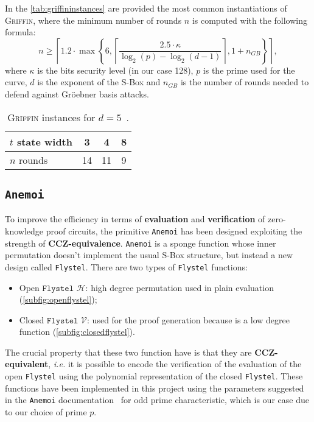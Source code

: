\documentclass[12pt, a4paper]{report}
\begin{document}
In the \autoref{tab:griffininstances} are provided the most common instantiations of \textsc{Griffin}, where the minimum number of rounds $n$ is computed with the following formula:
\begin{equation}
  n \ge \left\lceil 1.2 \cdot \max \left\{6, \left\lceil \frac{2.5 \cdot \kappa}{\log_2(p) - \log_2(d-1)} \right\rceil, 1 + n_{GB} \right\} \right\rceil ,
  \label{eq:griffinrounds}
\end{equation}
where $\kappa$ is the bits security level (in our case 128), $p$ is the prime used for the curve, $d$ is the exponent of the S-Box and $n_{GB}$ is the number of rounds needed to defend against Gr\"oebner basis attacks.

\begin{table}[H]
  \caption{\textsc{Griffin} instances for $d = 5$~\cite[Tab.~2]{griffin}.}\label{tab:griffininstances}
  \begin{center}
    \begin{tabular}{|l|c|c|c|}
      \hline
      $t$ state width & 3 & 4 & 8 \\
      \hline
      $n$ rounds & 14 & 11 & 9 \\
      \hline
    \end{tabular}
  \end{center}
\end{table}

\subsection{\texttt{Anemoi}}\label{subsec:anemoi}

To improve the efficiency in terms of \textbf{evaluation} and \textbf{verification} of zero-knowledge proof circuits, the primitive \texttt{Anemoi} has been designed exploiting the strength of \textbf{CCZ-equivalence}.
\texttt{Anemoi} is a sponge function whose inner permutation doesn't implement the usual S-Box structure, but instead a new design called \texttt{Flystel}.
There are two types of \texttt{Flystel} functions:
\begin{itemize}
  \item Open $\texttt{Flystel}$ $\mathcal{H}$: high degree permutation used in plain evaluation (\autoref{subfig:openflystel});
  \item Closed $\texttt{Flystel}$ $\mathcal{V}$: used for the proof generation because is a low degree function (\autoref{subfig:closedflystel}).
\end{itemize}
The crucial property that these two function have is that they are \textbf{CCZ-equivalent}, \textsl{i.e.} it is possible to encode the verification of the evaluation of the open \texttt{Flystel} using the polynomial representation of the closed \texttt{Flystel}.
These functions have been implemented in this project using the parameters suggested in the \texttt{Anemoi} documentation~\cite[Sec.~4.4]{anemoi} for odd prime characteristic, which is our case due to our choice of prime $p$.
\end{document}
